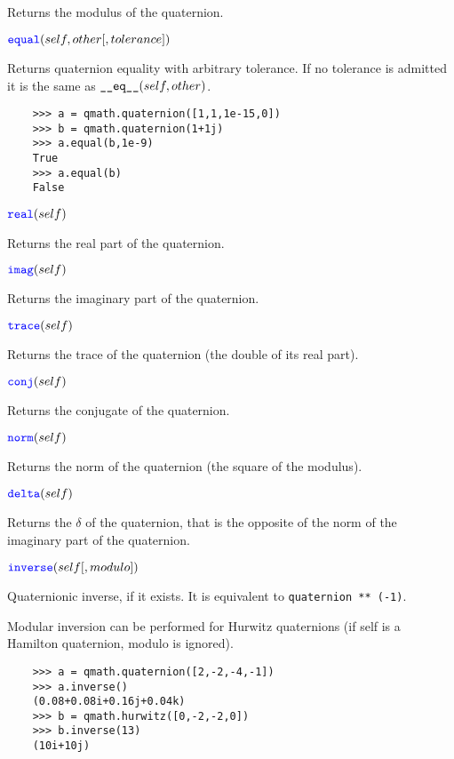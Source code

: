 \documentclass[11pt]{paper}
\begin{document}
Returns the modulus of the quaternion.

\medskip
\noindent $\textcolor{blue}{\texttt{\mbox{equal}}}(self,other[,tolerance])$ 

Returns quaternion equality with arbitrary tolerance. If no tolerance is admitted it is the same as $\texttt{\_\_\mbox{eq}\_\_}(self,other)$.
\begin{verbatim}
    >>> a = qmath.quaternion([1,1,1e-15,0])
    >>> b = qmath.quaternion(1+1j)
    >>> a.equal(b,1e-9)
    True
    >>> a.equal(b)
    False
\end{verbatim}

\medskip
\noindent $\textcolor{blue}{\texttt{\mbox{real}}}(self)$ 

Returns the real part of the quaternion.

\medskip
\noindent $\textcolor{blue}{\texttt{\mbox{imag}}}(self)$ 

Returns the imaginary part of the quaternion.

\medskip
\noindent $\textcolor{blue}{\texttt{\mbox{trace}}}(self)$ 

Returns the trace of the quaternion (the double of its real part).

\medskip
\noindent $\textcolor{blue}{\texttt{\mbox{conj}}}(self)$ 

Returns the conjugate of the quaternion.

\medskip
\noindent $\textcolor{blue}{\texttt{\mbox{norm}}}(self)$ 

Returns the norm of the quaternion (the square of the modulus).

\medskip
\noindent $\textcolor{blue}{\texttt{\mbox{delta}}}(self)$ 

Returns the $\delta$ of the quaternion, that is the opposite of the norm of the imaginary part of the quaternion.

\medskip
\noindent $\textcolor{blue}{\texttt{\mbox{inverse}}}(self[,modulo])$ 

Quaternionic inverse, if it exists. It is equivalent to \texttt{quaternion ** (-1)}.

\noindent Modular inversion can be performed for Hurwitz quaternions (if self is a Hamilton quaternion, modulo is ignored).
\begin{verbatim}
    >>> a = qmath.quaternion([2,-2,-4,-1])
    >>> a.inverse()
    (0.08+0.08i+0.16j+0.04k)
    >>> b = qmath.hurwitz([0,-2,-2,0])
    >>> b.inverse(13)
    (10i+10j)
\end{verbatim}
\end{document}

